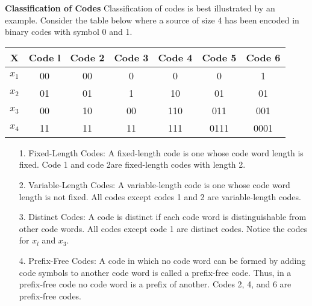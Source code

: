\documentclass[a4]{beamer}
\begin{document}

\noindent \textbf{Classification of Codes}
Classification of codes is best illustrated by an example. Consider the table below where a source of
size 4 has been encoded in binary codes with symbol 0 and 1.\\ \bigskip
\begin{center}
\begin{tabular}{|c| c| c| c| c| c| c|}
\hline
X& Code l& Code 2& Code 3 &Code 4& Code 5& Code 6\\\hline
$x_1$& 00& 00 &0 &0 &0 &1\\
$x_2$& 01& 01 &1 &10 &01 &01\\
$x_3$ &00 &10& 00& 110& 011 &001\\
$x_4$ &11& 11& 11& 111 &0111 &0001\\\hline
\end{tabular}
\end{center}




\begin{itemize}
\item[1.] Fixed-Length Codes: A fixed-length code is one whose code word length is fixed. Code 1 and code 2are
fixed-length codes with length 2.
\item[2.] Variable-Length Codes: A variable-length code is one whose code word length is not fixed. All codes except codes 1 and 2 are variable-length codes.
\item[3.] Distinct Codes:
A code is distinct if each code word is distinguishable from other code words. All codes except code 1 are distinct codes. Notice the codes for $x_l$ and $x_3$.
\item[4.] Prefix-Free Codes:
A code in which no code word can be formed by adding code symbols to another code word is
called a prefix-free code. Thus, in a prefix-free code no code word is a prefix of another. Codes 2, 4,
and 6 are prefix-free codes.
\end{itemize}


\end{document}
